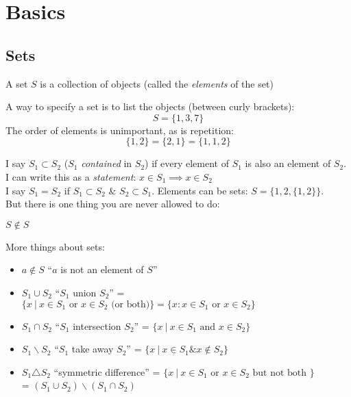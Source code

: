 \setcounter{lecture}{1}

\pagebreak

\section{Basics}
\setcounter{page}{4}

\subsection{Sets} %
\label{sub:sets}

A set $S$ is a collection of objects (called the \emph{elements} of the set) 
\begin{example}
A way to specify a set is to list the objects (between curly brackets):
\[S = \{1,3,7\}\]	
The order of elements is unimportant, as is repetition:
\[\{1,2\} = \{2,1\} = \{1,1,2\}\]
\end{example}

I say $S_1 \subset S_2$ ($S_1$ \emph{contained} in $S_2$) if every element of $S_1$ is also an element of $S_2$. I can write this as a \emph{statement}: $x \in S_1 \implies x \in S_2$\\

I say $S_1 = S_2$ if $S_1 \subset S_2$ \& $S_2 \subset S_1$. Elements can be sets: $S = \{1,2,\{1,2\}\}$.\\
 But there is one thing you are never allowed to do:

\begin{axiom}
$S \not \in S$	
\end{axiom}

More things about sets:
\begin{itemize}
\item $a \not \in S$ ``$a$ is not an element of $S$''
\item $S_1 \cup S_2$ ``$S_1$ union $S_2$'' = $\{x ~|~ x \in S_1 \text{ or } x \in S_2 \text{ (or both)}\} = \{x : x \in S_1 \text{ or } x \in S_2\}$
\item $S_1 \cap S_2$ ``$S_1$ intersection $S_2$'' = $\{x ~|~ x \in S_1 \text{ and } x \in S_2\}$
\item $S_1 \backslash S_2$ ``$S_1$ take away $S_2$'' = $\{x ~|~ x \in S_1 \& x \not \in S_2\}$
\item $S_1 \triangle S_2$ ``symmetric difference'' = $\{x ~|~ x \in S_1 \text{ or } x \in S_2 \text{ but not both }\}$\\ = $(S_1 \cup S_2) \backslash (S_1 \cap S_2)$
\end{itemize}

